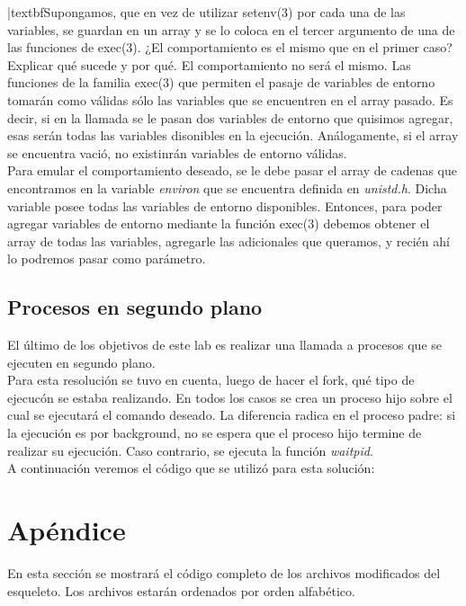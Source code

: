 \documentclass[a4paper, 12pt]{article}
\begin{document}
		|textbf{Supongamos, que en vez de utilizar setenv(3) por cada una de las variables, se guardan en un array y se lo coloca en el tercer argumento de una de las funciones de exec(3). ¿El comportamiento es el mismo que en el primer caso? Explicar qué sucede y por qué.} El comportamiento no será el mismo. Las funciones de la familia exec(3) que permiten el pasaje de variables de entorno tomarán como válidas sólo las variables que se encuentren en el array pasado. Es decir, si en la llamada se le pasan dos variables de entorno que quisimos agregar, esas serán todas las variables disonibles en la ejecución. Análogamente, si el array se encuentra vació, no existinrán variables de entorno válidas.\\
		Para emular el comportamiento deseado, se le debe pasar el array de cadenas que encontramos en la variable \textit{environ} que se encuentra definida en \textit{unistd.h}. Dicha variable posee todas las variables de entorno disponibles. Entonces, para poder agregar variables de entorno mediante la función exec(3) debemos obtener el array de todas las variables, agregarle las adicionales que queramos, y recién ahí lo podremos pasar como parámetro.
	
		\subsection{Procesos en segundo plano}
		El último de los objetivos de este lab es realizar una llamada a procesos que se ejecuten en segundo plano. \\
		
		Para esta resolución se tuvo en cuenta, luego de hacer el fork, qué tipo de ejecucón se estaba realizando. En todos los casos se crea un proceso hijo sobre el cual se ejecutará el comando deseado. La diferencia radica en el proceso padre: si la ejecución es por background, no se espera que el proceso hijo termine de realizar su ejecución. Caso contrario, se ejecuta la función \textit{waitpid}.\\
		
		A continuación veremos el código que se utilizó para esta solución: \\
		
		\bigskip\bigskip\bigskip
		
		
	\newpage
	\section{Apéndice}
	En esta sección se mostrará el código completo de los archivos modificados del esqueleto. Los archivos estarán ordenados por orden alfabético.\\
	
	
	\bigskip\bigskip\bigskip
	
	\bigskip\bigskip\bigskip
	
	
	
			
\end{document}
